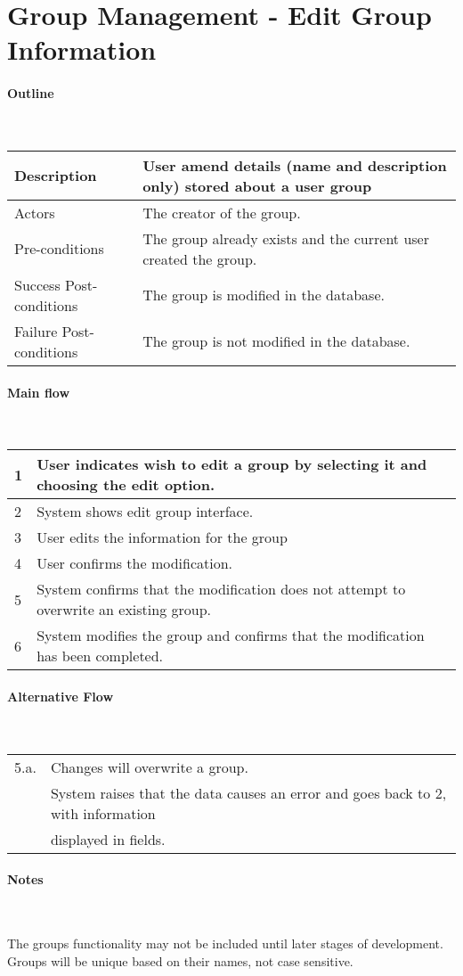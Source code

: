 \section*{Group Management - Edit Group Information} %

\paragraph*{Outline} \

\begin{tabular}{ | l | l | }
\hline
Description & User amend details (name and description only) stored about a user group \\ \hline
Actors & The creator of the group. \\ \hline
Pre-conditions & The group already exists and the current user created the group. \\ \hline
Success Post-conditions & The group is modified in the database. \\ \hline
Failure Post-conditions & The group is not modified in the database. \\ \hline
\end{tabular}


\paragraph*{Main flow} \

\begin{tabular}{ | l | l | } \hline
1 & User indicates wish to edit a group by selecting it and choosing the edit option. \\ \hline
2 & System shows edit group interface. \\ \hline
3 & User edits the information for the group \\ \hline
4 & User confirms the modification. \\ \hline
5 & System confirms that the modification does not attempt to overwrite an existing group. \\ \hline
6 & System modifies the group and confirms that the modification has been completed. \\ \hline
\end{tabular}


\paragraph*{Alternative Flow} \

\begin{tabular}{ | l | l | } \hline
5.a. & Changes will overwrite a group. \\
     & System raises that the data causes an error and goes back to 2, with information  \\
  & displayed in fields. \\ \hline
\end{tabular}

\paragraph*{Notes} \

The groups functionality may not be included until later stages of development. \\
Groups will be unique based on their names, not case sensitive.
